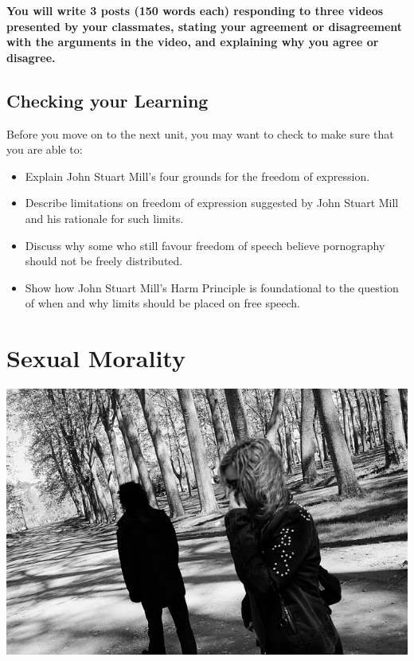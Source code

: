 \documentclass[
]{book}
\providecommand{\tightlist}{%
  \setlength{\itemsep}{0pt}\setlength{\parskip}{0pt}}
\begin{document}
\begin{caution}
\textbf{You will write 3 posts (150 words each) responding to three videos presented by your classmates, stating your agreement or disagreement with the arguments in the video, and explaining why you agree or disagree.}
\end{caution}

\hypertarget{checking-your-learning-4}{%
\section*{Checking your Learning}\label{checking-your-learning-4}}

\begin{progress}
Before you move on to the next unit, you may want to check to make sure that you are able to:

\begin{itemize}
\tightlist
\item
  Explain John Stuart Mill's four grounds for the freedom of expression.\\
\item
  Describe limitations on freedom of expression suggested by John Stuart Mill and his rationale for such limits.\\
\item
  Discuss why some who still favour freedom of speech believe pornography should not be freely distributed.\\
\item
  Show how John Stuart Mill's Harm Principle is foundational to the question of when and why limits should be placed on free speech.
\end{itemize}
\end{progress}

\hypertarget{sexual-morality}{%
\chapter{Sexual Morality}\label{sexual-morality}}

\includegraphics{assets/unit_6/portrait-119851_640.jpg}
\end{document}
